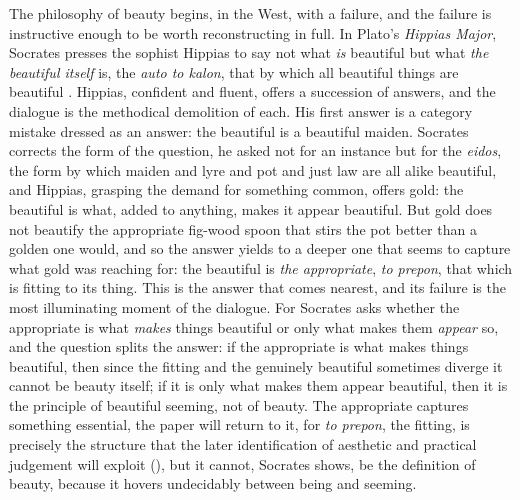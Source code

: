 The philosophy of beauty begins, in the West, with a failure, and the failure is instructive enough to be worth reconstructing in full. In Plato's \emph{Hippias Major}, Socrates presses the sophist Hippias to say not what \emph{is} beautiful but what \emph{the beautiful itself} is, the \emph{auto to kalon}, that by which all beautiful things are beautiful \parencite{plato1926}. Hippias, confident and fluent, offers a succession of answers, and the dialogue is the methodical demolition of each. His first answer is a category mistake dressed as an answer: the beautiful is a beautiful maiden. Socrates corrects the form of the question, he asked not for an instance but for the \emph{eidos}, the form by which maiden and lyre and pot and just law are all alike beautiful, and Hippias, grasping the demand for something common, offers gold: the beautiful is what, added to anything, makes it appear beautiful. But gold does not beautify the appropriate fig-wood spoon that stirs the pot better than a golden one would, and so the answer yields to a deeper one that seems to capture what gold was reaching for: the beautiful is \emph{the appropriate}, \emph{to prepon}, that which is fitting to its thing. This is the answer that comes nearest, and its failure is the most illuminating moment of the dialogue. For Socrates asks whether the appropriate is what \emph{makes} things beautiful or only what makes them \emph{appear} so, and the question splits the answer: if the appropriate is what makes things beautiful, then since the fitting and the genuinely beautiful sometimes diverge it cannot be beauty itself; if it is only what makes them appear beautiful, then it is the principle of beautiful seeming, not of beauty. The appropriate captures something essential, the paper will return to it, for \emph{to prepon}, the fitting, is precisely the structure that the later identification of aesthetic and practical judgement will exploit (), but it cannot, Socrates shows, be the definition of beauty, because it hovers undecidably between being and seeming.

